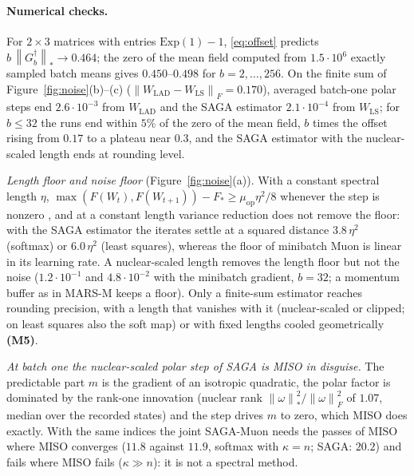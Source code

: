 \documentclass[10pt]{article}
\theoremstyle{remark}
\newcommand{\nnuc}[1]{\left\|#1\right\|_{*}}
\newcommand{\nF}[1]{\left\|#1\right\|_{F}}
\newcommand{\muop}{\mu_{\mathrm{op}}}
\newcommand{\finding}[1]{\textbf{(#1)}}
\begin{document}
\paragraph{Numerical checks.} For $2\times3$ matrices with entries $\mathrm{Exp}(1)-1$, \eqref{eq:offset} predicts
$b\,\nnuc{G_b^\dagger}\to0.464$; the zero of the mean field computed from $1.5\cdot10^6$ exactly sampled batch means gives
$0.450$--$0.498$ for $b=2,\dots,256$. On the finite sum of Figure~\ref{fig:noise}(b)--(c)
($\nF{W_{\mathrm{LAD}}-W_{\mathrm{LS}}}=0.170$), averaged batch-one polar steps end $2.6\cdot10^{-3}$ from $W_{\mathrm{LAD}}$ and
the SAGA estimator $2.1\cdot10^{-4}$ from $W_{\mathrm{LS}}$; for $b\le32$ the runs end within $5\%$ of the zero of the mean
field, $b$ times the offset rising from $0.17$ to a plateau near $0.3$, and the SAGA estimator with the nuclear-scaled
length ends at rounding level.

\begin{description}[leftmargin=2.3em,labelwidth=2.0em,labelsep=0.3em,itemsep=1pt,topsep=3pt,parsep=0pt,font=\normalfont\bfseries]
\item[(M1)] \emph{Length floor and noise floor} (Figure~\ref{fig:noise}(a)). With a constant spectral length $\eta$,
$\max(F(W_t),F(W_{t+1}))-F_\ast\ge\muop\eta^2/8$ whenever the step is nonzero \cite[Lemma~4]{jawanpuria2026constant}, and
at a constant length variance reduction does not remove the floor: with the SAGA estimator the iterates settle at a
squared distance $3.8\,\eta^2$ (softmax) or $6.0\,\eta^2$ (least squares), whereas the floor of minibatch Muon is linear in
its learning rate. A nuclear-scaled length removes the length floor but not the noise ($1.2\cdot10^{-1}$ and
$4.8\cdot10^{-2}$ with the minibatch gradient, $b=32$; a momentum buffer as in MARS-M \cite{liu2025marsm} keeps a floor).
Only a finite-sum estimator reaches rounding precision, with a length that vanishes with it (nuclear-scaled or clipped;
on least squares also the soft map) or with fixed lengths cooled geometrically \finding{M5}.
\item[(M2)] \emph{At batch one the nuclear-scaled polar step of SAGA is MISO in disguise.} The predictable part $m$ is the
gradient of an isotropic quadratic, the polar factor is dominated by the rank-one innovation (nuclear rank
$\nnuc\omega^2/\nF\omega^2$ of $1.07$, median over the recorded states) and the step drives $m$ to zero, which MISO does
exactly. With the same indices the joint SAGA-Muon needs the passes of MISO where MISO converges ($11.8$ against $11.9$,
softmax with $\kappa=n$; SAGA: $20.2$) and fails where MISO fails ($\kappa\gg n$): it is not a spectral method.
\end{description}
\end{document}
